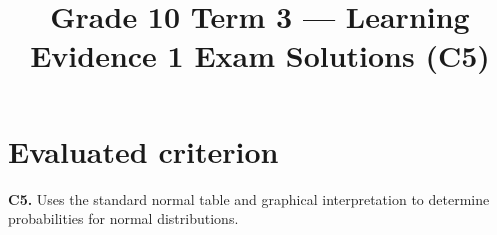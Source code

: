 \makeatletter
{}
\makeatother


\usepackage{pgfplots}
\pgfplotsset{compat=1.18}

\title{Grade 10 Term 3 --- Learning Evidence 1 Exam Solutions (C5)}
\author{}
\date{}


\maketitle

\section*{Evaluated criterion}
\textbf{C5.} Uses the standard normal table and graphical interpretation to determine probabilities for normal distributions.

